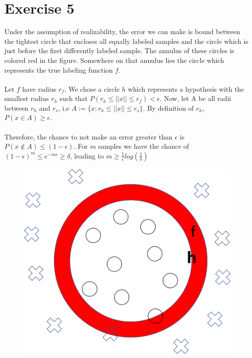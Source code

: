 \documentclass[12pt]{article}
\begin{document}
\section*{Exercise 5}

Under the assumption of realizability, the error we can make is bound between the tightest circle that encloses all equally labeled samples and the circle which is just before the first differently labeled sample. The annulus of these circles is colored red in the figure. Somewhere on that annulus lies the circle which represents the true labeling function $f$.
\\ \\
Let $f$ have radius $r_f$. We chose a circle $h$ which represents a hypothesis with the smallest radius $r_h$ such that $P(r_h \leq ||x|| \leq r_f) < \epsilon$. Now, let A be all radii between $r_h$ and $r_s$, i.e $A := \{x : r_h \leq ||x|| \leq r_s\}$. By definition of $r_h$, $P(x \in A) \geq \epsilon$.
\\ \\
Therefore, the chance to not make an error greater than $\epsilon$ is $P(x \notin A) \le (1 - \epsilon)$. For $m$ samples we have the chance of $(1-\epsilon)^m \leq e^{-m\epsilon} \geq \delta$, leading to $m \geq \frac{1}{\epsilon} log(\frac{1}{\delta})$


\begin{figure}
	\centering
	\includegraphics[width=0.7\linewidth]{Bild1}
\end{figure}
\end{document}
